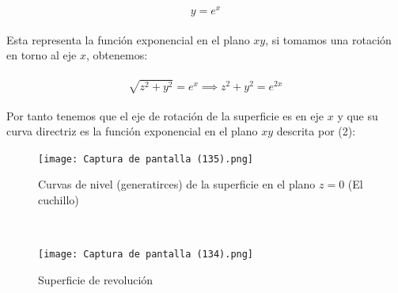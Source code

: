 \documentclass[11pt,letterpaper]{article}
\begin{document}
     \begin{equation}
        y=e^x
     \end{equation}\,\\
     Esta representa la funci\'on exponencial en el plano $xy$, si tomamos una rotaci\'on en torno al eje $x$, obtenemos:\,\\
     \,\\
     \begin{equation*}
        \sqrt{z^2+y^2}=e^x\implies z^2+y^2=e^{2x}
     \end{equation*}\,\\
     Por tanto tenemos que el eje de rotaci\'on de la superficie es en eje $x$ y que su curva directriz es la funci\'on exponencial
     en el plano $xy$ descrita por (2):
     
     \begin{figure}
     \centering
    \texttt{[image: Captura de pantalla (135).png]}
    \caption{Curvas de nivel (generatirces) de la superficie en el plano $z=0$ (El cuchillo)}
    \label{Cono rebanado}
     \end{figure}\,\\

     \begin{figure}
        \centering
        \texttt{[image: Captura de pantalla (134).png]}
        \caption{Superficie de revoluci\'on}
        \label{Cono rebanado}
        \newpage
     \end{figure}\,\\
\newpage
\end{document}
